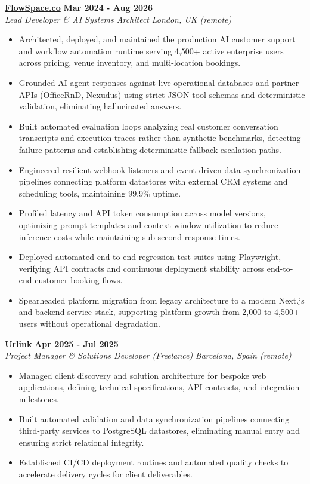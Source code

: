 \documentclass[10pt,a4paper]{article}
\newcommand{\role}[4]{%
  \textbf{#1} \hfill \textbf{#2}\\[1pt]%
  \textit{#3} \hfill \textit{#4}\\[2pt]%
}
\begin{document}
\role{\href{https://flowspace.co}{FlowSpace.co}}{Mar 2024 - Aug 2026}{Lead Developer \& AI Systems Architect}{London, UK (remote)}
\begin{itemize}
  \item Architected, deployed, and maintained the production AI customer support and workflow automation runtime serving 4,500+ active enterprise users across pricing, venue inventory, and multi-location bookings.
  \item Grounded AI agent responses against live operational databases and partner APIs (OfficeRnD, Nexudus) using strict JSON tool schemas and deterministic validation, eliminating hallucinated answers.
  \item Built automated evaluation loops analyzing real customer conversation transcripts and execution traces rather than synthetic benchmarks, detecting failure patterns and establishing deterministic fallback escalation paths.
  \item Engineered resilient webhook listeners and event-driven data synchronization pipelines connecting platform datastores with external CRM systems and scheduling tools, maintaining 99.9\% uptime.
  \item Profiled latency and API token consumption across model versions, optimizing prompt templates and context window utilization to reduce inference costs while maintaining sub-second response times.
  \item Deployed automated end-to-end regression test suites using Playwright, verifying API contracts and continuous deployment stability across end-to-end customer booking flows.
  \item Spearheaded platform migration from legacy architecture to a modern Next.js and backend service stack, supporting platform growth from 2,000 to 4,500+ users without operational degradation.
\end{itemize}

\role{Urlink}{Apr 2025 - Jul 2025}{Project Manager \& Solutions Developer (Freelance)}{Barcelona, Spain (remote)}
\begin{itemize}
  \item Managed client discovery and solution architecture for bespoke web applications, defining technical specifications, API contracts, and integration milestones.
  \item Built automated validation and data synchronization pipelines connecting third-party services to PostgreSQL datastores, eliminating manual entry and ensuring strict relational integrity.
  \item Established CI/CD deployment routines and automated quality checks to accelerate delivery cycles for client deliverables.
\end{itemize}
\end{document}
